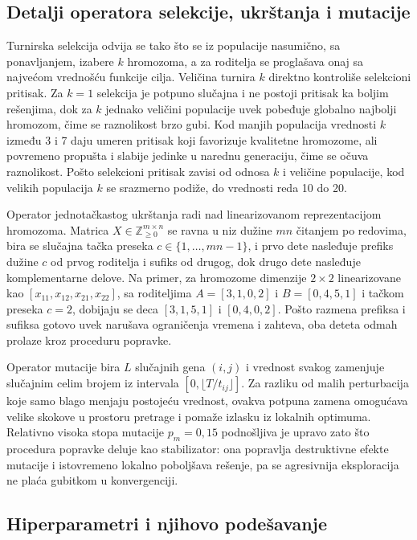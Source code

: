 \documentclass[12pt]{article}
\begin{document}
\subsection{Detalji operatora selekcije, ukrštanja i mutacije}

Turnirska selekcija odvija se tako što se iz populacije nasumično, sa ponavljanjem, izabere $k$ hromozoma, a za roditelja se proglašava onaj sa najvećom vrednošću funkcije cilja. Veličina turnira $k$ direktno kontroliše selekcioni pritisak. Za $k = 1$ selekcija je potpuno slučajna i ne postoji pritisak ka boljim rešenjima, dok za $k$ jednako veličini populacije uvek pobeđuje globalno najbolji hromozom, čime se raznolikost brzo gubi. Kod manjih populacija vrednosti $k$ između 3 i 7 daju umeren pritisak koji favorizuje kvalitetne hromozome, ali povremeno propušta i slabije jedinke u narednu generaciju, čime se očuva raznolikost. Pošto selekcioni pritisak zavisi od odnosa $k$ i veličine populacije, kod velikih populacija $k$ se srazmerno podiže, do vrednosti reda 10 do 20.

Operator jednotačkastog ukrštanja radi nad linearizovanom reprezentacijom hromozoma. Matrica $X \in \mathbb{Z}_{\geq 0}^{m \times n}$ se ravna u niz dužine $mn$ čitanjem po redovima, bira se slučajna tačka preseka $c \in \{1, \dots, mn-1\}$, i prvo dete nasleđuje prefiks dužine $c$ od prvog roditelja i sufiks od drugog, dok drugo dete nasleđuje komplementarne delove. Na primer, za hromozome dimenzije $2 \times 2$ linearizovane kao $[x_{11}, x_{12}, x_{21}, x_{22}]$, sa roditeljima $A = [3, 1, 0, 2]$ i $B = [0, 4, 5, 1]$ i tačkom preseka $c = 2$, dobijaju se deca $[3, 1, 5, 1]$ i $[0, 4, 0, 2]$. Pošto razmena prefiksa i sufiksa gotovo uvek narušava ograničenja vremena i zahteva, oba deteta odmah prolaze kroz proceduru popravke.

Operator mutacije bira $L$ slučajnih gena $(i, j)$ i vrednost svakog zamenjuje slučajnim celim brojem iz intervala $[0, \lfloor T/t_{ij} \rfloor]$. Za razliku od malih perturbacija koje samo blago menjaju postojeću vrednost, ovakva potpuna zamena omogućava velike skokove u prostoru pretrage i pomaže izlasku iz lokalnih optimuma. Relativno visoka stopa mutacije $p_m = 0{,}15$ podnošljiva je upravo zato što procedura popravke deluje kao stabilizator: ona popravlja destruktivne efekte mutacije i istovremeno lokalno poboljšava rešenje, pa se agresivnija eksploracija ne plaća gubitkom u konvergenciji.

\subsection{Hiperparametri i njihovo podešavanje}
\end{document}
